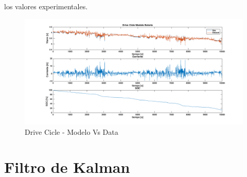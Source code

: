 \documentclass[10pt]{beamer}
\theoremstyle{remark}
\theoremstyle{definition}
\begin{document}
\begin{frame}[allowframebreaks]
  	los valores experimentales.
  	\begin{figure}[!h]
		\centering
		\includegraphics[width=0.85\linewidth]{images/Drive_Cicle_Modelo_Bateria.png}
		\caption{Drive Cicle - Modelo Vs Data}
		\label{fig:DC_modVsData}
  	\end{figure}
\end{frame}

\section{Filtro de Kalman}
\end{document}
